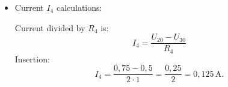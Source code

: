 {\begin{itemize}
            The solution is:
            \[ U_{10} = 1,5 \, \text{V}, \quad U_{20} = 0,75 \, \text{V}, \quad U_{30} = 0,5 \, \text{V}. \]

        \item[\bf d)]
            Current \(I_4\) calculations:

            Current divided by \(R_4\) is:
            \[ I_4 = \frac{U_{20} - U_{30}}{R_4} \]
            Insertion:
            \[ I_4 = \frac{0,75 - 0,5}{2 \cdot 1} = \frac{0,25}{2} = 0,125 \, \text{A}. \]

	\end{itemize}
}